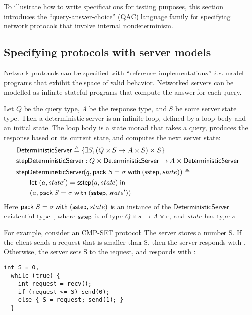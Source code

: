 To illustrate how to write specifications for testing purposes, this section
introduces the ``query-answer-choice'' (QAC) language family for specifying
network protocols that involve internal nondeterminism.

\subsection{Specifying protocols with server models}
Network protocols can be specified with ``reference implementations'' {\it i.e.}
model programs that exhibit the space of valid behavior.  Networked servers can
be modelled as infinite stateful programs that compute the answer for each
query.
\begin{definition}
  \label{def:qaserver}
Let $Q$ be the query type, $A$ be the response type, and $S$ be some server
state type.  Then a deterministic server is an infinite loop, defined by a loop
body and an initial state.  The loop body is a state monad that takes a query,
produces the response based on its current state, and computes the next server
state:
\begin{align*}
  &\mathsf{DeterministicServer}\triangleq\{\exists S,(Q \times S \to A \times S) \times S\} \\
  &\mathsf{stepDeterministicServer}:Q\times \mathsf{DeterministicServer} \to A\times \mathsf{DeterministicServer} \\
  &\mathsf{stepDeterministicServer}(q,\mathsf{pack}\;S=\sigma\;\mathsf{with}\;(\mathsf{sstep}, state))\triangleq\\
  &\qquad\mathsf{let}\;(a,state')=\mathsf{sstep}(q,state)\;\mathsf{in}\; \\
  &\qquad(a, \mathsf{pack}\;S=\sigma\;\mathsf{with}\;(\mathsf{sstep}, state'))
\end{align*}
Here $\mathsf{pack}\;S=\sigma\;\mathsf{with}\;(\mathsf{sstep}, state)$ is an instance of the
$\mathsf{DeterministicServer}$ existential type~\cite{tapl}, where $\mathsf{sstep}$ is
of type $Q\times\sigma\to A\times\sigma$, and $state$ has type $\sigma$.
\end{definition}

For example, consider an CMP-SET protocol: The server stores a number
\inlinec S.  If the client sends a request that is smaller than
\inlinec S, then the server responds with .  Otherwise, the
server sets \inlinec S to the request, and responds with :
\begin{lstlisting}[style=customc]
  int S = 0;
  while (true) {
    int request = recv();
    if (request <= S) send(0);
    else { S = request; send(1); }
  }
\end{lstlisting}

